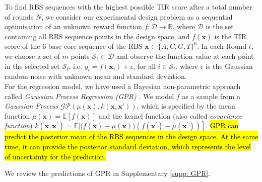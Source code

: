 \documentclass{scrartcl}[2013/05/29]%
\newcommand{\mengyan}[1]{\textcolor{magenta}{#1}}
\begin{document}
To find RBS sequences with the highest possible TIR score after a total number of rounds $N$, we consider our experimental design problem as a sequential optimisation of an unknown reward function $f: \mathcal{D} \rightarrow \mathbb{R}$, where $\mathcal{D}$ is the set containing all RBS sequence points in the design space, and $f(\mathbf{x})$ is the TIR score of the 6-base core sequence of the RBS $\mathbf{x} \in \{A,C,G,T\}^{6}$.
In each Round $t$, we choose a set of $m$ points $\mathcal{S}_t \subset \mathcal{D}$ and observe the function value at each point in the selected set $\mathcal{S}_t$, i.e. $y_i = f(\mathbf{x}_i) + \epsilon$, for all $i \in \mathcal{S}_t$, where $\epsilon$ is the Gaussian random noise with unknown mean and standard deviation. \\

For the regression model, we have used a Bayesian non-parametric approach called \textit{Gaussian Process Regression (GPR)} \cite{Rasmussen2004,srinivas2012information, romero_navigating_2013}.
We model $f$ as a sample from a \textit{Gaussian Process} $\mathcal{G} \mathcal{P}(\mu(\mathbf{x}), k(\mathbf{x}, \mathbf{x'}))$, which is specified by the mean function $\mu(\mathbf{x})=\mathbb{E}[f(\mathbf{x})]$ and the kernel function (also called \textit{covariance function}) $k\left(\mathbf{x}, \mathbf{x}^{\prime}\right)=\mathbb{E}[(f(\mathbf{x})-\left.\mu(\mathbf{x}))\left(f\left(\mathbf{x}^{\prime}\right)-\mu\left(\mathbf{x}^{\prime}\right)\right)\right]$.
\hl{GPR can predict the posterior mean of the RBS sequences in the design space. At the same time, it can provide the posterior standard deviation, which represents the level of uncertainty for the prediction.}

We review the predictions of GPR in Supplementary \ref{supp: GPR}.\\

\end{document}

